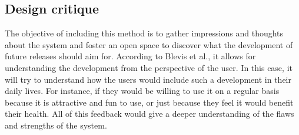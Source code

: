 \subsection{Design critique}
The objective of including this method is to gather impressions and thoughts about the system and foster an open space to discover what the development of future releases should aim for. According to Blevis et al., \cite{Blevis2007} it allows for understanding the development from the perspective of the user. In this case, it will try to understand how the users would include such a development in their daily lives. For instance, if they would be willing to use it on a regular basis because it is attractive and fun to use, or just because they feel it would benefit their health. All of this feedback would give a deeper understanding of the flaws and strengths of the system.

\iffalse
\quotes{Process of discourse on many levels of the nature and effects of an ultimate particular design}. \quotes{Comment on the qualities of an ultimate particular from an holistic perspective, including reason, ethics, and aesthetics as well as minute details of form and external effects on culture}.\cite{Blevis2007}
\fi


